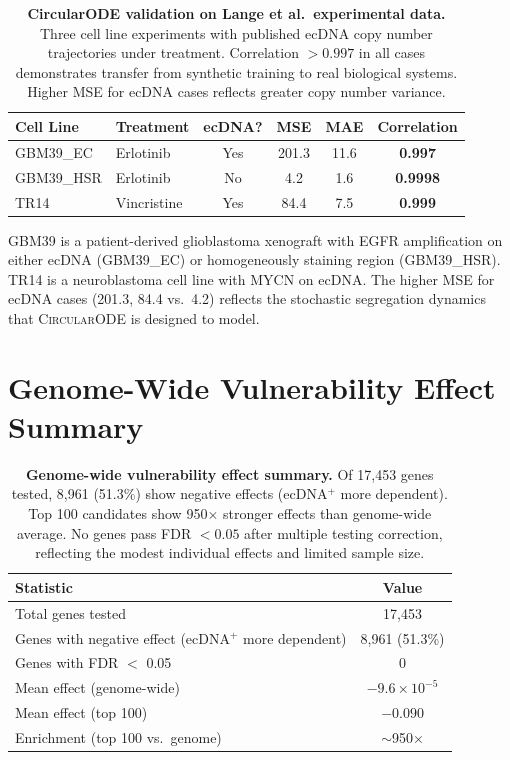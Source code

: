 \documentclass[sigconf,anonymous]{acmart}
\newcommand{\circularode}{\textsc{CircularODE}}
\begin{document}
\begin{table}[h]
\caption{\textbf{CircularODE validation on Lange et al.\ experimental data.} Three cell line experiments with published ecDNA copy number trajectories under treatment. Correlation $>0.997$ in all cases demonstrates transfer from synthetic training to real biological systems. Higher MSE for ecDNA cases reflects greater copy number variance.}
\label{tab:circularode_ext}
\centering
\small
\begin{tabular}{@{}llcccc@{}}
\toprule
Cell Line & Treatment & ecDNA? & MSE & MAE & Correlation \\
\midrule
GBM39\_EC & Erlotinib & Yes & 201.3 & 11.6 & \textbf{0.997} \\
GBM39\_HSR & Erlotinib & No & 4.2 & 1.6 & \textbf{0.9998} \\
TR14 & Vincristine & Yes & 84.4 & 7.5 & \textbf{0.999} \\
\bottomrule
\end{tabular}
\end{table}

GBM39 is a patient-derived glioblastoma xenograft with EGFR amplification on either ecDNA (GBM39\_EC) or homogeneously staining region (GBM39\_HSR). TR14 is a neuroblastoma cell line with MYCN on ecDNA. The higher MSE for ecDNA cases (201.3, 84.4 vs.\ 4.2) reflects the stochastic segregation dynamics that \circularode{} is designed to model.


\section{Genome-Wide Vulnerability Effect Summary}
\label{app:genomewide}

\begin{table}[h]
\caption{\textbf{Genome-wide vulnerability effect summary.} Of 17,453 genes tested, 8,961 (51.3\%) show negative effects (ecDNA$^+$ more dependent). Top 100 candidates show 950$\times$ stronger effects than genome-wide average. No genes pass FDR $<0.05$ after multiple testing correction, reflecting the modest individual effects and limited sample size.}
\label{tab:genomewide}
\centering
\small
\begin{tabular}{@{}lc@{}}
\toprule
Statistic & Value \\
\midrule
Total genes tested & 17,453 \\
Genes with negative effect (ecDNA$^+$ more dependent) & 8,961 (51.3\%) \\
Genes with FDR $<$ 0.05 & 0 \\
Mean effect (genome-wide) & $-9.6 \times 10^{-5}$ \\
Mean effect (top 100) & $-0.090$ \\
Enrichment (top 100 vs.\ genome) & $\sim$950$\times$ \\
\bottomrule
\end{tabular}
\end{table}
\end{document}

